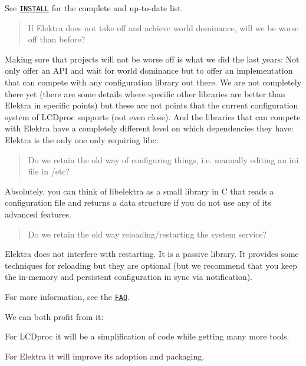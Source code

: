 See \href{https://www.libelektra.org/docgettingstarted/installation}{\tt I\+N\+S\+T\+A\+LL} for the complete and up-\/to-\/date list.

\begin{quote}
If Elektra does not take off and achieve world dominance, will we be worse off than before? \end{quote}


Making sure that projects will not be worse off is what we did the last years\+: Not only offer an A\+PI and wait for world dominance but to offer an implementation that can compete with any configuration library out there. We are not completely there yet (there are some details where specific other libraries are better than Elektra in specific points) but these are not points that the current configuration system of L\+C\+Dproc supports (not even close). And the libraries that can compete with Elektra have a completely different level on which dependencies they have\+: Elektra is the only one only requiring libc.

\begin{quote}
Do we retain the old way of configuring things, i.\+e. manually editing an ini file in /etc? \end{quote}


Absolutely, you can think of libelektra as a small library in C that reads a configuration file and returns a data structure if you do not use any of its advanced features.

\begin{quote}
Do we retain the old way reloading/restarting the system service? \end{quote}


Elektra does not interfere with restarting. It is a passive library. It provides some techniques for reloading but they are optional (but we recommend that you keep the in-\/memory and persistent configuration in sync via notification).

For more information, see the \href{https://www.libelektra.org/manpages/elektra-faq}{\tt F\+AQ}.

We can both profit from it\+:


\begin{DoxyEnumerate}
\item For L\+C\+Dproc it will be a simplification of code while getting many more tools.
\item For Elektra it will improve its adoption and packaging.
\end{DoxyEnumerate}

